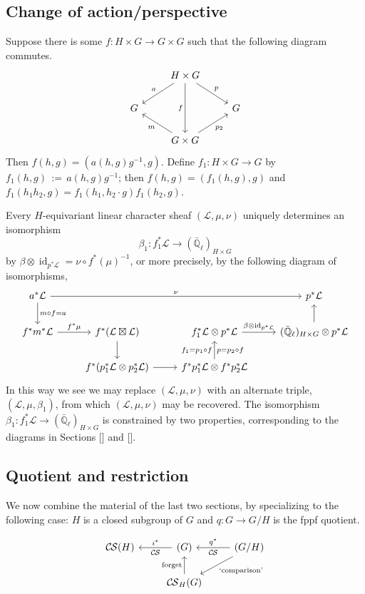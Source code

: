 \documentclass[10pt]{amsart}
\theoremstyle{plain}
\theoremstyle{definition}
\newcommand{\EE}{\mathbb{\bar Q}_\ell}
\DeclareMathOperator{\id}{id}
\newcommand{\ceq}{{\, :=\, }}
\newcommand{\cs}[1]{{\mathcal{#1}}}
\newcommand{\CS}{{\mathcal{C\hskip-0.8pt S}}}
\begin{document}
\subsection{Change of action/perspective}

Suppose there is some $f : H\times G\to G\times G$ such that the following diagram commutes.
\[
\begin{tikzcd}
\ &  \arrow{dl}[swap]{a} H \times G \arrow{dr}{p} \arrow{dd}[swap]{f} & \\
G & & G \\
& \arrow{ul}{m} G \times G \arrow{ur}[swap]{p_2} & 
\end{tikzcd}
\]
Then $f(h,g) = (a(h,g) g^{-1}, g)$.
Define $f_1: H\times G \to G$ by $f_1(h,g)\ceq a(h,g) g^{-1}$; then $f(h,g) = (f_1(h,g),g)$ and $f_1(h_1 h_2,g) = f_1(h_1, h_2\cdot g) f_1(h_2,g)$.

Every $H$-equivariant linear character sheaf $(\cs{L},\mu, \nu)$ uniquely determines an isomorphism 
\[
\beta_1 : f_1^*\cs{L} \to (\EE)_{H\times G}
\]
by $\beta \otimes \id_{p^*\cs{L}} = \nu \circ f^*(\mu)^{-1}$, or more precisely, by the following diagram of isomorphisms,
\[
\begin{tikzcd}
a^*\cs{L} \arrow{d}{m\circ f = a} \arrow{rrr}{\nu}
&&& p^*\cs{L}\\
f^* m^*\cs{L} \arrow{r}{f^*\mu} & 
f^*(\cs{L}\boxtimes \cs{L}) \arrow{d} & 
f_1^*\cs{L} \otimes p^*\cs{L} \arrow{r}{\beta\otimes \id_{p^*\cs{L}}} & 
(\EE)_{H\times G} \otimes p^*\cs{L} \arrow{u} \\
& f^*(p_1^*\cs{L}\otimes p_2^*\cs{L}) \arrow{r} & f^*p_1^*\cs{L}\otimes f^* p_2^*\cs{L} \arrow{u}{f_1 = p_1\circ f}[swap]{p = p_2\circ f} &
\end{tikzcd}
\]
In this way we see we may replace $(\cs{L},\mu,\nu)$ with an alternate triple, $(\cs{L},\mu,\beta_1)$, from which $(\cs{L},\mu,\nu)$ may be recovered.
The isomorphism $\beta_1 : f_1^*\cs{L} \to (\EE)_{H\times G}$ is constrained by two properties, corresponding to the diagrams in Sections [] and [].

\subsection{Quotient and restriction}

We now combine the material of the last two sections, by specializing to the following case: $H$ is a closed subgroup of $G$ and $q : G \to G/H$ is the fppf quotient.

\[
\begin{tikzcd}
\CS(H) & \arrow{l}[swap]{i^*} \CS(G) &\arrow{l}[swap]{q^*} 
\CS(G/H) \arrow{dl}{\text{`comparison'}} \\
 & \CS_{H}(G) \arrow{u}{\text{forget}}  & 
\end{tikzcd}
\]
\end{document}
